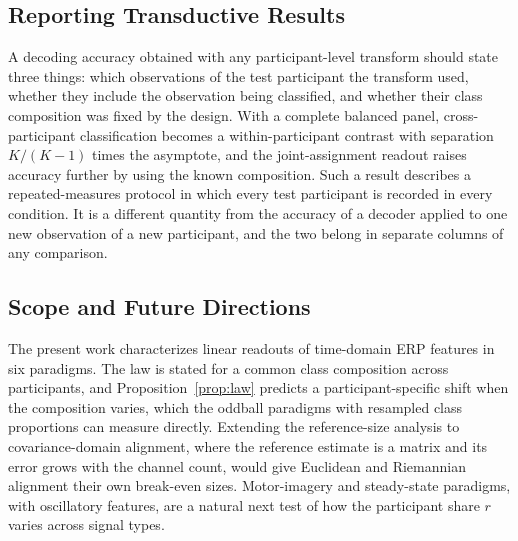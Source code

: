 \subsection{Reporting Transductive Results}
A decoding accuracy obtained with any participant-level transform should state three things: which observations of the test participant the transform used, whether they include the observation being classified, and whether their class composition was fixed by the design. With a complete balanced panel, cross-participant classification becomes a within-participant contrast with separation $K/(K-1)$ times the asymptote, and the joint-assignment readout raises accuracy further by using the known composition. Such a result describes a repeated-measures protocol in which every test participant is recorded in every condition. It is a different quantity from the accuracy of a decoder applied to one new observation of a new participant, and the two belong in separate columns of any comparison.

\subsection{Scope and Future Directions}
The present work characterizes linear readouts of time-domain ERP features in six paradigms. The law is stated for a common class composition across participants, and Proposition~\ref{prop:law} predicts a participant-specific shift when the composition varies, which the oddball paradigms with resampled class proportions can measure directly. Extending the reference-size analysis to covariance-domain alignment, where the reference estimate is a matrix and its error grows with the channel count, would give Euclidean and Riemannian alignment their own break-even sizes. Motor-imagery and steady-state paradigms, with oscillatory features, are a natural next test of how the participant share $r$ varies across signal types.
